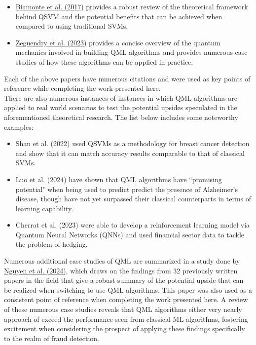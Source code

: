 \documentclass[11pt, oneside]{article}   	%
\begin{document}
\begin{itemize}

\item \href{https://arxiv.org/abs/1611.09347}{Biamonte et al. (2017)} provides a robust review of the theoretical framework behind QSVM and the potential benefits that can be achieved when compared to using traditional SVMs. 
\item \href{https://pubmed.ncbi.nlm.nih.gov/36832654/}{Zeguendry et al. (2023)} provides a concise overview of the quantum mechanics involved in building QML algorithms and provides numerous case studies of how these algorithms can be applied in practice. 


\end{itemize}

\noindent\hspace{10mm}Each of the above papers have numerous citations and were used as key points of reference while completing the work presented here. \\

\noindent\hspace{10mm}There are also numerous instances of instances in which QML algorithms are applied to real world scenarios to test the potential upsides speculated in the aforementioned theoretical research. The list below includes some noteworthy examples: 

\begin{itemize}

\item Shan et al. (2022) used QSVMs as a methodology for breast cancer detection and show that it can match accuracy results comparable to that of classical SVMs.
\item Luo et al. (2024) have shown that QML algorithms have ``promising potential" when being used to predict predict the presence of Alzheimer's disease, though have not yet surpassed their classical counterparts in terms of learning capability.  
\item Cherrat et al. (2023) were able to develop a reinforcement learning model via Quantum Neural Networks (QNNs) and used financial sector data to tackle the problem of hedging. 

\end{itemize}

\noindent\hspace{10mm}Numerous additional case studies of QML are summarized in a study done by \href{https://arxiv.org/abs/2406.13262}{Nguyen et al. (2024)}, which draws on the findings from 32 previously written papers in the field that give a robust summary of the potential upside that can be realized when switching to use QML algorithms. This paper was also used as a consistent point of reference when completing the work presented here. A review of these numerous case studies reveals that QML algorithms either very nearly approach of exceed the performance seen from classical ML algorithms, fostering excitement when considering the prospect of applying these findings specifically to the realm of fraud detection. \\
\end{document}
